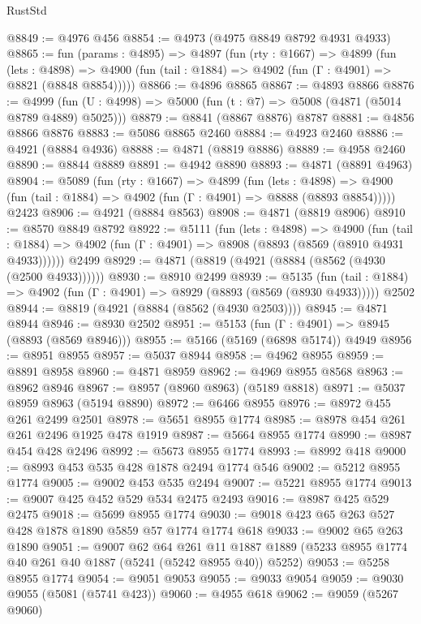 \begin{lexlean}{RustStd}
\begin{coremodule}
@8849 := @4976 @456
@8854 := @4973 (@4975 @8849 @8792 @4931 @4933)
@8865 := fun (params : @4895) =>
  @4897
    (fun (rty : @1667) =>
    @4899
      (fun (lets : @4898) =>
      @4900 (fun (tail : @1884) => @4902 (fun (Γ : @4901) => @8821 (@8848 @8854)))))
@8866 := @4896 @8865
@8867 := @4893 @8866
@8876 := @4999 (fun (U : @4998) => @5000 (fun (t : @7) => @5008 (@4871 (@5014 @8789 @4889) @5025)))
@8879 := @8841 (@8867 @8876) @8787
@8881 := @4856 @8866 @8876
@8883 := @5086 @8865 @2460
@8884 := @4923 @2460
@8886 := @4921 (@8884 @4936)
@8888 := @4871 (@8819 @8886)
@8889 := @4958 @2460
@8890 := @8844 @8889
@8891 := @4942 @8890
@8893 := @4871 (@8891 @4963)
@8904 := @5089
    (fun (rty : @1667) =>
    @4899
      (fun (lets : @4898) =>
      @4900 (fun (tail : @1884) => @4902 (fun (Γ : @4901) => @8888 (@8893 @8854)))))
    @2423
@8906 := @4921 (@8884 @8563)
@8908 := @4871 (@8819 @8906)
@8910 := @8570 @8849 @8792
@8922 := @5111
    (fun (lets : @4898) =>
    @4900
      (fun (tail : @1884) => @4902 (fun (Γ : @4901) => @8908 (@8893 (@8569 (@8910 @4931 @4933))))))
    @2499
@8929 := @4871 (@8819 (@4921 (@8884 (@8562 (@4930 (@2500 @4933))))))
@8930 := @8910 @2499
@8939 := @5135
    (fun (tail : @1884) => @4902 (fun (Γ : @4901) => @8929 (@8893 (@8569 (@8930 @4933)))))
    @2502
@8944 := @8819 (@4921 (@8884 (@8562 (@4930 @2503))))
@8945 := @4871 @8944
@8946 := @8930 @2502
@8951 := @5153 (fun (Γ : @4901) => @8945 (@8893 (@8569 @8946)))
@8955 := @5166 (@5169 (@6898 @5174)) @4949
@8956 := @8951 @8955
@8957 := @5037 @8944
@8958 := @4962 @8955
@8959 := @8891 @8958
@8960 := @4871 @8959
@8962 := @4969 @8955 @8568
@8963 := @8962 @8946
@8967 := @8957 (@8960 @8963) (@5189 @8818)
@8971 := @5037 @8959 @8963 (@5194 @8890)
@8972 := @6466 @8955
@8976 := @8972 @455 @261 @2499 @2501
@8978 := @5651 @8955 @1774
@8985 := @8978 @454 @261 @261 @2496 @1925 @478 @1919
@8987 := @5664 @8955 @1774
@8990 := @8987 @454 @428 @2496
@8992 := @5673 @8955 @1774
@8993 := @8992 @418
@9000 := @8993 @453 @535 @428 @1878 @2494 @1774 @546
@9002 := @5212 @8955 @1774
@9005 := @9002 @453 @535 @2494
@9007 := @5221 @8955 @1774
@9013 := @9007 @425 @452 @529 @534 @2475 @2493
@9016 := @8987 @425 @529 @2475
@9018 := @5699 @8955 @1774
@9030 := @9018 @423 @65 @263 @527 @428 @1878 @1890 @5859 @57 @1774 @1774 @618
@9033 := @9002 @65 @263 @1890
@9051 := @9007
    @62
    @64
    @261
    @11
    @1887
    @1889
    (@5233 @8955 @1774 @40 @261 @40 @1887 (@5241 (@5242 @8955 @40)) @5252)
@9053 := @5258 @8955 @1774
@9054 := @9051 @9053
@9055 := @9033 @9054
@9059 := @9030 @9055 (@5081 (@5741 @423))
@9060 := @4955 @618
@9062 := @9059 (@5267 @9060)

\end{coremodule}
\end{lexlean}
